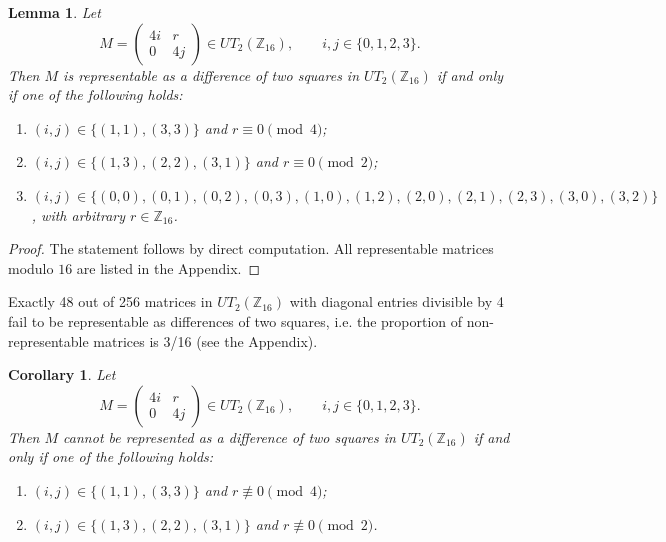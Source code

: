\documentclass[11pt]{amsart}
\newtheorem{lemma}[theorem]{Lemma}
\newtheorem{corollary}[theorem]{Corollary}
\begin{document}
\begin{lemma}\label{lemma:mod16-classification}
Let
\[
M=\begin{pmatrix}4i&r\\0&4j\end{pmatrix}\in UT_2(\mathbb Z_{16}),
\qquad i,j\in\{0,1,2,3\}.
\]
Then $M$ is representable as a difference of two squares in $UT_2(\mathbb Z_{16})$ if and only if one of the following holds:
\begin{enumerate}
\item $(i,j)\in\{(1,1),(3,3)\}$ and $r\equiv0\pmod4$;
\item $(i,j)\in\{(1,3),(2,2),(3,1)\}$ and $r\equiv0\pmod2$;
\item $(i,j)\in\{(0,0),(0,1),(0,2),(0,3),(1,0),(1,2),(2,0),(2,1),(2,3),(3,0),(3,2)\}$, with arbitrary $r\in\mathbb Z_{16}$.
\end{enumerate}
\end{lemma}
\begin{proof} The statement follows by direct computation. All representable matrices modulo $16$ are listed in the Appendix.
\end{proof}
Exactly 48 out of 256 matrices in $UT_2(\mathbb Z_{16})$ with diagonal entries divisible by 4 fail to be representable as differences of two squares, i.e. the proportion of non-representable matrices is 3/16 (see the Appendix).

\begin{corollary}\label{cor:nonrep-mod16}
Let
\[
M=\begin{pmatrix}4i&r\\0&4j\end{pmatrix}\in UT_2(\mathbb Z_{16}),
\qquad i,j\in\{0,1,2,3\}.
\]
Then $M$ cannot be represented as a difference of two squares in $UT_2(\mathbb Z_{16})$ if and only if one of the following holds:
\begin{enumerate}
\item$(i,j)\in\{(1,1),(3,3)\}$ and $r\not\equiv 0\pmod 4$;
\item$(i,j)\in\{(1,3),(2,2),(3,1)\}$ and $r\not\equiv 0\pmod 2$.
\end{enumerate}
\end{corollary}
\end{document}
